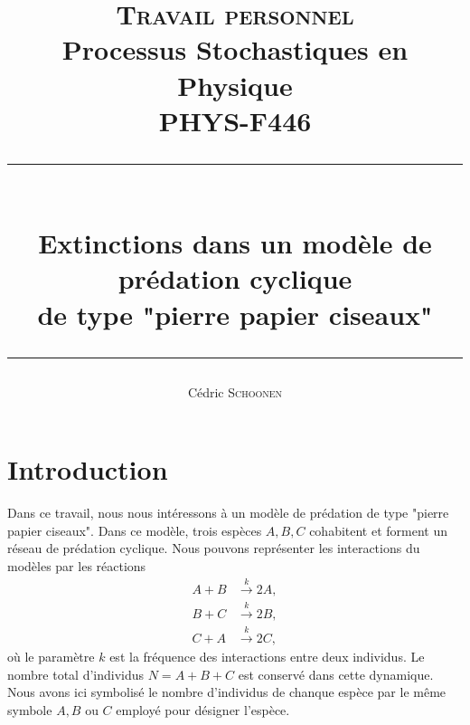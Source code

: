 \documentclass[openany,a4paper,12pt]{article}
\title{
\textsc{Travail personnel}\\ 
Processus Stochastiques en Physique\\
PHYS-F446\\
\rule{\linewidth}{1pt} \\
\vspace{3mm}
Extinctions dans un modèle de prédation cyclique \\
de type "pierre papier ciseaux"\\
\rule{\linewidth}{1pt}
}
\author{Cédric \textsc{Schoonen}}
\begin{document}
\maketitle
\vspace{2cm}

\tableofcontents

\newpage





\section{Introduction}
\label{section_introduction}

\par Dans ce travail, nous nous intéressons à un modèle de prédation de type "pierre papier ciseaux". Dans ce modèle, trois espèces $A,B,C$ cohabitent et forment un réseau de prédation cyclique. Nous pouvons représenter les interactions du modèles par les réactions
%
\begin{equation}\label{reactions_k}
\begin{split}
	A + B & \overset{k}{\longrightarrow} 2A, \\
	B + C & \overset{k}{\longrightarrow} 2B, \\
	C + A & \overset{k}{\longrightarrow} 2C, 
\end{split}
\end{equation}
%
où le paramètre $k$ est la fréquence des interactions entre deux individus. Le nombre total d'individus $N=A+B+C$ est conservé dans cette dynamique. Nous avons ici symbolisé le nombre d'individus de chanque espèce par le même symbole $A,B$ ou $C$ employé pour désigner l'espèce.
\end{document}
